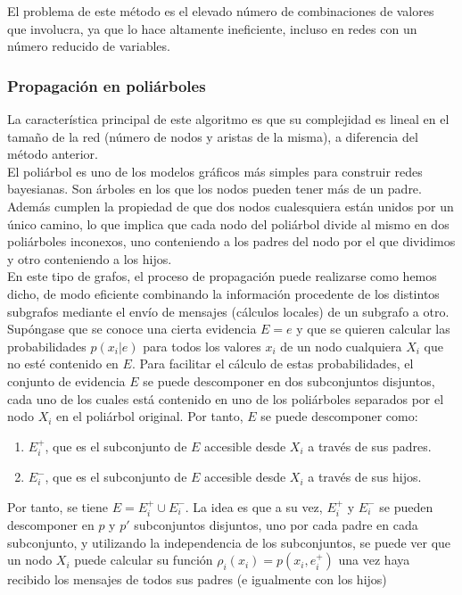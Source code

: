 \documentclass{article}
\theoremstyle{definition_wo_parentheses}
\begin{document}
El problema de este método es el elevado número de combinaciones de valores que involucra, ya que lo hace altamente ineficiente, incluso en redes con un número reducido de variables.

\subsubsection{Propagación en poliárboles}
La característica principal de este algoritmo es que su complejidad es lineal en el tamaño de la red (número de nodos y aristas de la misma), a diferencia del método anterior.\\
El poliárbol es uno de los modelos gráficos más simples para construir redes bayesianas. Son árboles en los que los nodos pueden tener más de un padre. Además cumplen la propiedad de que dos nodos cualesquiera están unidos por un único camino, lo que implica que cada nodo del poliárbol divide al mismo en dos poliárboles inconexos, uno conteniendo a los padres del nodo por el que dividimos y otro conteniendo a los hijos.\\
En este tipo de grafos, el proceso de propagación puede realizarse como hemos dicho, de modo eficiente combinando la información procedente de los distintos subgrafos mediante el envío de mensajes (cálculos locales) de un subgrafo a otro. Supóngase que se conoce una cierta evidencia $E=e$ y que se quieren calcular las probabilidades $p(x_i|e)$ para todos los valores $x_i$ de un nodo cualquiera $X_i$ que no esté contenido en $E$. Para facilitar el cálculo de estas probabilidades, el conjunto de evidencia $E$ se puede descomponer en dos subconjuntos disjuntos, cada uno de los cuales está contenido en uno de los poliárboles separados por el nodo $X_i$ en el poliárbol original. Por tanto, $E$ se puede descomponer como:
\begin{enumerate}
\item $E_i^+$, que es el subconjunto de $E$ accesible desde $X_i$ a través de sus padres.
\item $E_i^-$, que es el subconjunto de $E$ accesible desde $X_i$ a través de sus hijos.
\end{enumerate}
Por tanto, se tiene $E=E_i^+ \cup E_i^-$. La idea es que a su vez, $E_i^+$ y $E_i^-$ se pueden descomponer en $p$ y $p'$ subconjuntos disjuntos, uno por cada padre en cada subconjunto, y utilizando la independencia de los subconjuntos, se puede ver que un nodo $X_i$ puede calcular su función $\rho_i(x_i)=p(x_i,e_i^+)$ una vez haya recibido los mensajes de todos sus padres (e igualmente con los hijos)
\end{document}
